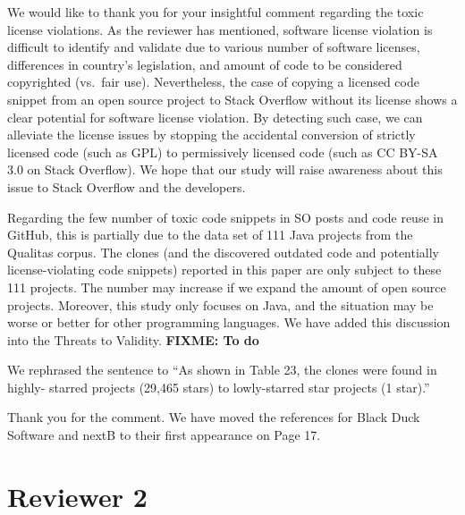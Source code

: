 \documentclass[a4paper,twoside,10pt]{reviewresponse}
\newcommand\FIXME[1]{{\color{red}\textbf{FIXME: #1}}}
\begin{document}
We would like to thank you for your insightful comment regarding the toxic license violations. As the reviewer has mentioned, software license violation is difficult to identify and validate due to various number of software licenses, differences in country's legislation, and amount of code to be considered copyrighted (vs.~fair use). Nevertheless, the case of copying a licensed code snippet from an open source project to Stack Overflow without its license shows a clear potential for software license violation. By detecting such case, we can alleviate the license issues by stopping the accidental conversion of strictly licensed code (such as GPL) to permissively licensed code (such as CC BY-SA 3.0 on Stack Overflow). We hope that our study will raise awareness about this issue to Stack Overflow and the developers.

Regarding the few number of toxic code snippets in SO posts and code reuse in GitHub, this is partially due to the data set of 111 Java projects from the Qualitas corpus. The clones (and the discovered outdated code and potentially license-violating code snippets) reported in this paper are only subject to these 111 projects. The number may increase if we expand the amount of open source projects. Moreover, this study only focuses on Java, and the situation may be worse or better for other programming languages. We have added this discussion into the Threats to Validity. \FIXME{To do}


We rephrased the sentence to ``As shown in Table 23, the clones were found in highly- starred projects (29,465 stars) to lowly-starred star projects (1 star).''


Thank you for the comment. We have moved the references for Black Duck Software and nextB to their first appearance on Page 17.

\section{Reviewer 2}
\end{document}
